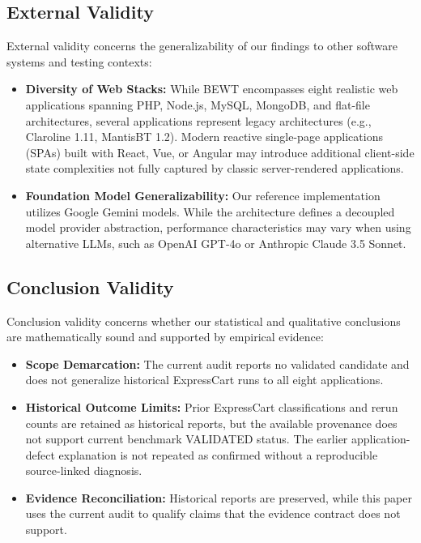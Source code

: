 \documentclass[pdflatex,sn-mathphys-num]{sn-jnl}
\begin{document}
\subsection{External Validity}

External validity concerns the generalizability of our findings to other software systems and testing contexts:
\begin{itemize}
    \item \textbf{Diversity of Web Stacks:} While BEWT encompasses eight realistic web applications spanning PHP, Node.js, MySQL, MongoDB, and flat-file architectures, several applications represent legacy architectures (e.g., Claroline 1.11, MantisBT 1.2). Modern reactive single-page applications (SPAs) built with React, Vue, or Angular may introduce additional client-side state complexities not fully captured by classic server-rendered applications.
    \item \textbf{Foundation Model Generalizability:} Our reference implementation utilizes Google Gemini models. While the architecture defines a decoupled model provider abstraction, performance characteristics may vary when using alternative LLMs, such as OpenAI GPT-4o or Anthropic Claude 3.5 Sonnet.
\end{itemize}

\subsection{Conclusion Validity}

Conclusion validity concerns whether our statistical and qualitative conclusions are mathematically sound and supported by empirical evidence:
\begin{itemize}
    \item \textbf{Scope Demarcation:} The current audit reports no validated candidate and does not generalize historical ExpressCart runs to all eight applications.
    \item \textbf{Historical Outcome Limits:} Prior ExpressCart classifications and rerun counts are retained as historical reports, but the available provenance does not support current benchmark VALIDATED status. The earlier application-defect explanation is not repeated as confirmed without a reproducible source-linked diagnosis.
    \item \textbf{Evidence Reconciliation:} Historical reports are preserved, while this paper uses the current audit to qualify claims that the evidence contract does not support.
\end{itemize}
\end{document}
